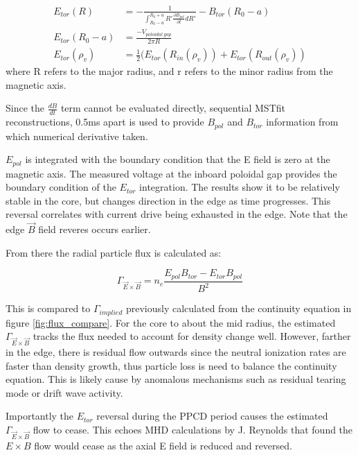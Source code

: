 \documentclass[aip, pop, preprint]{revtex4-1}
\begin{document}
\begin{align}
E_{tor}(R) & = -\frac{1}{\int_{R_0 - a}^{R_0 + a} R' \frac{\partial B_{pol}}{\partial t} dR'} - B_{tor}(R_0 - a) \label{eqn:E_tor}\\
E_{tor} (R_0 - a) & = \frac{- V_{poloidal\ gap} }{2 \pi R}\label{eqn:E_tor_bc}\\
E_{tor}(\rho_v) & = \frac{1}{2}(E_{tor}(R_{in}(\rho_v)) + E_{tor}(R_{out}(\rho_v))
\end{align}
where R refers to the major radius, and r refers to the minor radius from the magnetic axis.

Since the $ \frac{dB}{dt} $ term cannot be evaluated directly, sequential MSTfit reconstructions, 0.5ms apart is used to provide $ B_{pol} $ and $ B_{tor} $ information from which numerical derivative taken.

$E_{pol}$ is integrated with the boundary condition that the E field is zero at the magnetic axis. The measured voltage at the inboard poloidal gap provides the boundary condition of the $ E_{tor} $ integration. The results show it to be relatively stable in the core, but changes direction in the edge as time progresses. This reversal correlates with current drive being exhausted in the edge. Note that the edge $\vec{B}$ field reveres occurs earlier.

From there the radial particle flux is calculated as:

\begin{equation}
\Gamma_{\vec{E} \times \vec{B}} = n_{e} \frac{E_{pol}B_{tor} - E_{tor}B_{pol}}{B^2}
\end{equation}

This is compared to $\Gamma_{implied}$ previously calculated from the continuity equation in figure \ref{fig:flux_compare}. For the core to about the mid radius, the estimated $\Gamma_{\vec{E} \times \vec{B}}$ tracks the flux needed to account for density change well. However, farther in the edge, there is residual flow outwards since the neutral ionization rates are faster than density growth, thus particle loss is need to balance the continuity equation. This is likely cause by anomalous mechanisms such as residual tearing mode or drift wave activity.

Importantly the $ E_{tor} $ reversal during the PPCD period causes the estimated $ \Gamma_{\vec{E} \times \vec{B}} $ flow to cease. This echoes MHD calculations by J. Reynolds that found the $ E \times B $ flow would cease as the axial E field is reduced and reversed\cite{ReynoldsThesis}.
\end{document}
